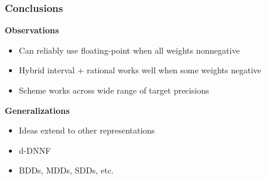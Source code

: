 \documentclass[t,pdf]{beamer}
\begin{document}
\begin{frame}
  \frametitle{Conclusions}

  \bigskip
  
\textbf{Observations}

\medskip

  \begin{itemize}
  \item Can reliably use floating-point when all weights nonnegative
  \item Hybrid interval + rational works well when some weights negative
  \item Scheme works across wide range of target precisions
  \end{itemize}

  \bigskip
  
\textbf{Generalizations}  

  \begin{itemize}
  \item Ideas extend to other representations
  \item d-DNNF
  \item BDDs, MDDs, SDDs, etc.
  \end{itemize}

\end{frame}
\end{document}
